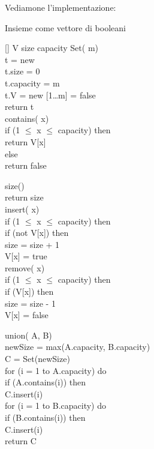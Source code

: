 Vediamone l'implementazione:
\begin{code}{Insieme come vettore di booleani}
\begin{minipage}[t]{0.48\textwidth}
[] V\hfill{}
 size\hfill{}
 capacity\hfill{}
\nl\ind{} Set( m)\\
     t = new \\
    t.size = 0\\
    t.capacity = m\\
    t.V = new [1\dots m] = {false}\\
    return t\\

\ind{} contains( x)\\
    \indf if (1 $\leq$ x $\leq$ capacity) then\\
        return V[x]\\
    \indf else\\
        return false
\end{minipage}
\hfill
\begin{minipage}[t]{0.48\textwidth}
\ind{} size()\\
    return size\\

\ind insert( x)\\
    \indf if (1 $\leq$ x $\leq$ capacity) then\\
        \indff if (not V[x]) then\\
            size = size + 1\\
            V[x] = true\\

\ind remove( x)\\
\indf if (1 $\leq$ x $\leq$ capacity) then\\
    \indff if (V[x]) then\\
        size = size - 1\\
        V[x] = false
\end{minipage}
\newline\nl\ind{} union( A,  B)\\
     newSize = max(A.capacity, B.capacity)\\
     C = Set(newSize)\\
    \ind for (i = 1 to A.capacity) do\\
        \indf if (A.contains(i)) then\\
            \indff C.insert(i)\\
    \ind for (i = 1 to B.capacity) do\\
        \indf if (B.contains(i)) then\\
            \indff C.insert(i)\\
    \ind return C
\end{code}
